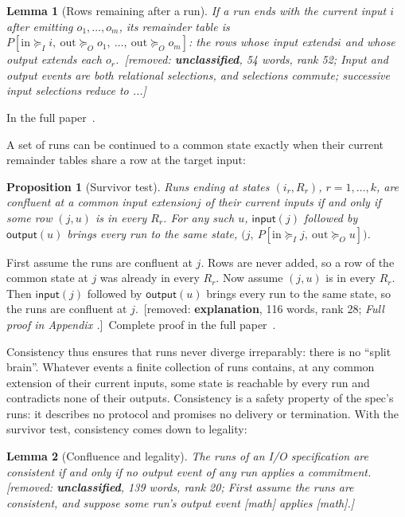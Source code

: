 \documentclass[sigconf]{cidr-2027}
\makeatletter
\newtheorem{proposition}{Proposition}
\newtheorem{lemma}{Lemma}
\theoremstyle{remark}
\newcommand{\InputGe}{\succeq_I}
\newcommand{\OutputGe}{\succeq_O}
\newcommand{\commitment}{commitment\xspace}
\newcommand{\inrel}{extends\xspace}          %
\newcommand{\indesc}{input extension\xspace} %
\newcommand{\outrel}{extends\xspace}          %
\newcommand{\spectype}[1][]{I/O specification#1\xspace}
\newcommand{\fullproof}{Complete proof in the full paper~\cite{hellerstein2026completecalmfull}.}
\newcommand{\proofinfull}{\par\pushQED{\qed}\normalfont\topsep2\p@\relax
  \trivlist\item[\@proofindent\hskip\labelsep{\@proofnamefont\proofname\@addpunct{.}}]%
  \ignorespaces In the full paper~\cite{hellerstein2026completecalmfull}.%
  \popQED\endtrivlist\@endpefalse}
\renewenvironment{proof}[1][\proofname]{\par
  \pushQED{\qed}\normalfont\topsep2\p@\relax
  \trivlist\item[\@proofindent\hskip\labelsep{\@proofnamefont #1\@addpunct{.}}]\ignorespaces
}{\popQED\endtrivlist\@endpefalse}
\newcommand{\removednote}[1]{{\color{cutred}\footnotesize\,[removed: #1]\,}}
\makeatother
\begin{document}
\begin{lemma}[Rows remaining after a run]
\label{lem:run-residual}
\textcolor{newblue}{If a run ends with the current input $i$ after emitting
$o_1,\ldots,o_m$, its remainder table is \(P[\mathrm{in}\InputGe i,\ \mathrm{out}\OutputGe o_1,\ \ldots,\
  \mathrm{out}\OutputGe o_m]\): the rows whose input \inrel $i$ and whose
output \outrel each $o_r$.} \removednote{\textbf{unclassified}, 54 words, rank 52; \textit{Input and output events are both relational selections, and selections commute; successive input selections reduce to ...}}
\end{lemma}
\textcolor{newblue}{\proofinfull}

A set of runs can be continued to a common state exactly when their current
remainder tables share a row at the target input:

\begin{proposition}[Survivor test]
\label{prop:confluence}
Runs ending at states $(i_r,R_r)$, $r=1,\ldots,k$, are confluent at a common
\indesc $j$ of their current inputs if and only if some row $(j,u)$ is in every
$R_r$. For any such $u$, $\mathsf{input}(j)$ followed by $\mathsf{output}(u)$
brings every run to the same state,
$\bigl(j,\ P[\mathrm{in}\InputGe j,\ \mathrm{out}\OutputGe u]\bigr)$.
\end{proposition}

\begin{proof}[Proof sketch]
First assume the runs are confluent at $j$. Rows are never added, so a row of
the common state at $j$ was already in every $R_r$. Now assume $(j,u)$ is in
every $R_r$. Then $\mathsf{input}(j)$ followed by $\mathsf{output}(u)$ brings
every run to the same state, so the runs are confluent at $j$. \removednote{\textbf{explanation}, 116 words, rank 28; \textit{Full proof in Appendix .}} \textcolor{newblue}{\fullproof}
\end{proof}

\textcolor{newblue}{Consistency thus ensures that runs never diverge irreparably: there is no
``split brain''.} \textcolor{newblue}{Whatever events a finite collection of runs contains, at any common extension of their current inputs, some state is reachable by every run
and contradicts none of their outputs.} \textcolor{newblue}{Consistency is a safety property of the spec's runs:
it describes no protocol and promises no delivery or termination.} With the survivor test, consistency comes down to legality:

\begin{lemma}[Confluence and legality]
\label{lem:confluence-legality}
The runs of an \spectype are consistent if and only if no output event of any
run applies a \commitment. \removednote{\textbf{unclassified}, 139 words, rank 20; \textit{First assume the runs are consistent, and suppose some run's output event [math] applies [math].}}
\end{lemma}
\end{document}
